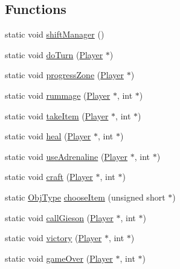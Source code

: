 \subsection*{Functions}
\begin{DoxyCompactItemize}
\item 
static void \hyperlink{group__game_ga96997515bdc703f69dbb3df24d8342a7}{shift\+Manager} ()
\item 
static void \hyperlink{group__game_gaf21601075374fa679f09cafa941b41ed}{do\+Turn} (\hyperlink{group__game_gac6f795d0d2e88ee469ddc704329e7cc3}{Player} $\ast$)
\item 
static void \hyperlink{group__game_ga60a90b03a3bbf68f9034843d5bbb59a6}{progress\+Zone} (\hyperlink{group__game_gac6f795d0d2e88ee469ddc704329e7cc3}{Player} $\ast$)
\item 
static void \hyperlink{group__game_ga63c1d1fc43a8568c5509c3616fefa14f}{rummage} (\hyperlink{group__game_gac6f795d0d2e88ee469ddc704329e7cc3}{Player} $\ast$, int $\ast$)
\item 
static void \hyperlink{group__game_gaa6abddd4d89336e676f85cc4b5562101}{take\+Item} (\hyperlink{group__game_gac6f795d0d2e88ee469ddc704329e7cc3}{Player} $\ast$, int $\ast$)
\item 
static void \hyperlink{group__game_ga95540730276b746fb5fae9061b50d3ad}{heal} (\hyperlink{group__game_gac6f795d0d2e88ee469ddc704329e7cc3}{Player} $\ast$, int $\ast$)
\item 
static void \hyperlink{group__game_ga660302bc9e06f744f7492e364abeb37d}{use\+Adrenaline} (\hyperlink{group__game_gac6f795d0d2e88ee469ddc704329e7cc3}{Player} $\ast$, int $\ast$)
\item 
static void \hyperlink{group__game_gada5c5b8cf9361720770a151aacfb961f}{craft} (\hyperlink{group__game_gac6f795d0d2e88ee469ddc704329e7cc3}{Player} $\ast$, int $\ast$)
\item 
static \hyperlink{gamelib_8h_a21ada50c882656c2a4723dde25f56d4a}{Obj\+Type} \hyperlink{group__game_gae64c2690b081867e40de1714f9fa669d}{choose\+Item} (unsigned short $\ast$)
\item 
static void \hyperlink{group__game_gab3355c8ac255799fc0a453b3177afdf6}{call\+Gieson} (\hyperlink{group__game_gac6f795d0d2e88ee469ddc704329e7cc3}{Player} $\ast$, int $\ast$)
\item 
static void \hyperlink{group__game_ga83efd39426fa23b683c9ac8edf60ac85}{victory} (\hyperlink{group__game_gac6f795d0d2e88ee469ddc704329e7cc3}{Player} $\ast$, int $\ast$)
\item 
static void \hyperlink{group__game_ga17a56084a7a5dd2f21a5693387271249}{game\+Over} (\hyperlink{group__game_gac6f795d0d2e88ee469ddc704329e7cc3}{Player} $\ast$, int $\ast$)
\end{DoxyCompactItemize}
